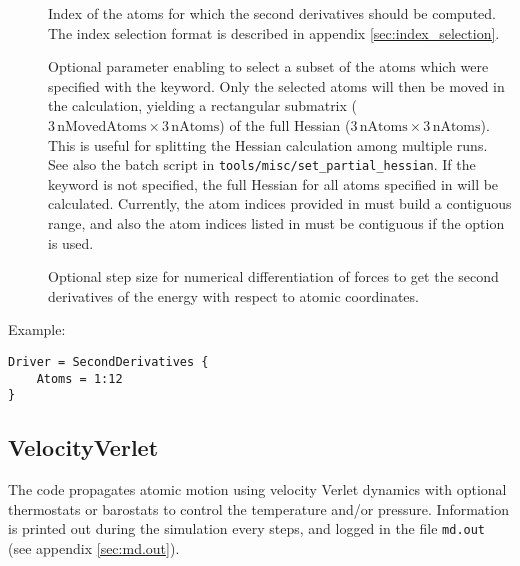 \begin{description}
\item[] Index of the atoms for which the second derivatives should be
  computed. The index selection format is described in appendix
  \ref{sec:index_selection}.

\item[] Optional parameter enabling to select a subset of the
  atoms which were specified with the  keyword. Only the selected
  atoms will then be moved in the calculation, yielding a rectangular submatrix
  ($3\,\text{nMovedAtoms} \times 3\,\text{nAtoms}$) of the full Hessian
  ($3\,\text{nAtoms} \times 3\,\text{nAtoms}$). This is useful for splitting the
  Hessian calculation among multiple \dftbp{} runs.  See also the batch script
  in \texttt{tools/misc/set\_partial\_hessian}. If the keyword is not specified,
  the full Hessian for all atoms specified in  will be calculated.
  Currently, the atom indices provided in  must build a
  contiguous range, and also the atom indices listed in  must be
  contiguous if the  option is used.

\item[] Optional step size for numerical
  differentiation of forces to get the second derivatives of the energy with
  respect to atomic coordinates.
\end{description}

Example:
\begin{verbatim}
Driver = SecondDerivatives {
    Atoms = 1:12
}
\end{verbatim}


\subsection{VelocityVerlet\cb}
\label{sec:dftbp.VelocityVerlet}

The code propagates atomic motion using velocity Verlet dynamics with optional
thermostats or barostats to control the temperature and/or pressure. Information
is printed out during the simulation every
 steps, and logged in the
file \verb|md.out| (see appendix \ref{sec:md.out}).

